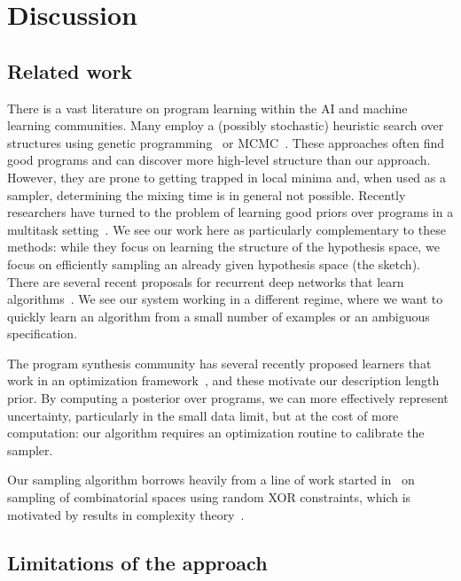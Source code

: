 \documentclass{article}
\begin{document}
\section{Discussion}

\subsection{Related work}
There is a vast literature on program learning within the AI and machine learning communities.
Many employ a (possibly stochastic) heuristic search over structures using genetic programming~\cite{DBLP:books/daglib/0070933} or MCMC~\cite{schkufza2013stochastic}.
These approaches often find good programs and can discover more high-level structure than our approach.
However, they are prone to getting trapped in local minima
and, when used as a sampler, determining the mixing time is in general not possible.
Recently researchers have turned to the problem of learning good priors over programs in a multitask setting~\cite{DBLP:conf/icml/LiangJK10,menon2013machine,Dechter:2013:BLV:2540128.2540316}.
We see our work here as particularly complementary to these methods: while they focus on learning the structure of the hypothesis space,
we focus on efficiently sampling an already given hypothesis space (the sketch).
There are several recent proposals for recurrent deep networks that learn algorithms~\cite{DBLP:journals/corr/ReedF15,graves2014neural}.
We see our system working in a different regime,
where we want to quickly learn an algorithm from a small number of examples or an ambiguous specification.

The program synthesis community has several recently proposed learners that work in an optimization framework~\cite{raychev2016learning,ellis2015unsupervised,singh2013automated}, and these motivate our description length prior.
By computing a posterior over programs, we can more effectively represent uncertainty, particularly in the small data limit, but at the cost of more computation: our algorithm requires an optimization routine to calibrate the sampler.


Our sampling algorithm borrows heavily from a line of work started in~\cite{gomes2006near,gomes2006model} on sampling of combinatorial spaces using random XOR constraints, which is motivated by results in complexity theory~\cite{valiant1985np}.

\subsection{Limitations of the approach}
\end{document}

